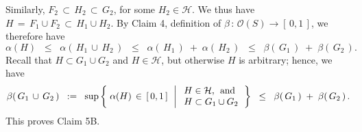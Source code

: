 Similarly, $F_{2} \,\subset\, H_{2} \,\subset\, G_{2}$, for some $H_{2} \in \mathcal{H}$.
We thus have $H \,=\, F_{1} \cup F_{2} \,\subset\, H_{1} \cup H_{2}$.
By Claim 4, definition of $\beta \,:\, \mathcal{O}(S) \longrightarrow [\,0,1\,]$, we therefore have
\begin{equation*}
\alpha(H)
\;\; \leq \;\; \alpha\!\left(\,H_{1}\,\cup\,H_{2}\,\right)
\;\; \leq \;\; \alpha\!\left(\,H_{1}\,\right) \; + \; \alpha\!\left(\,H_{2}\,\right)
\;\; \leq \;\; \beta\!\left(\,G_{1}\,\right) \; + \; \beta\!\left(\,G_{2}\,\right).
\end{equation*}
Recall that $H \subset G_{1} \cup G_{2}$ and $H \in \mathcal{H}$, but otherwise $H$ is arbitrary;
hence, we have
\begin{equation*}
\beta\!\left(\,G_{1}\,\cup\,G_{2}\,\right)
\;\; := \;\;
\sup\left\{\;
	\alpha(H) \,\in\, [\,0,1\,]
	\,\;\left\vert\;
		\begin{array}{l} H \in \mathcal{H}, \;\,\textnormal{and} \\ H \subset G_{1} \cup G_{2} \end{array}
	\right.
\right\}
\;\;\leq\;\; \beta\!\left(\,G_{1}\,\right) \; + \; \beta\!\left(\,G_{2}\,\right).
\end{equation*}
This proves Claim 5B. %


